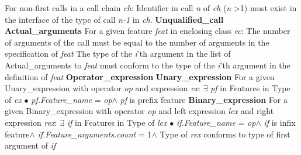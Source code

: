 \indent \indent For non-first calls in a call chain \textit{ch}:\newline
\indent \indent \indent Identifier in call \textit{n} of \textit{ch} (\textit{n} \textgreater 1) must exist in the interface of the type of call \textit{n-1} in \textit{ch}.\newline
\indent \textbf{Unqualified\_call}\newline
\indent \indent \textbf{Actual\_arguments}\newline
\indent \indent \indent For a given feature \textit{feat} in enclosing class \textit{ec}:\newline
\indent \indent \indent \indent The number of arguments of the call must be equal to the number of arguments in the \newline
\indent \indent \indent \indent specification of \textit{feat}\newline
\indent \indent \indent The type of the \textit{i}'th argument in the list of Actual\_arguments to \textit{feat} must conform to the \newline
\indent \indent \indent type of the \textit{i}'th argument in the definition of \textit{feat}\newline
\indent \textbf{Operator\_expression}\newline
\indent \indent \textbf{Unary\_expression}\newline
\indent \indent \indent For a given Unary\_expression with operator \textit{op} and expression \textit{ex}:\newline
\indent \indent \indent \indent $\exists$ \textit{pf} in Features in Type of \textit{ex} $\bullet$ \textit{pf.Feature\_name} = \textit{op}$\wedge$ \textit{pf} is prefix feature\newline
\indent \indent \textbf{Binary\_expression}\newline
\indent \indent \indent For a given Binary\_expression with operator \textit{op} and left expression \textit{lex} and right expression \newline
\indent \indent \indent \textit{rex}:\newline
\indent \indent \indent \indent $\exists$ \textit{if} in Features in Type of \textit{lex} $\bullet$ \textit{if.Feature\_name} = \textit{op}$\wedge$ \textit{if} is infix feature$\wedge$ \textit{if.Feature\_arguments.count} \newline
\indent \indent \indent \indent = 1$\wedge$ Type of \textit{rex} conforms to type of first argument of \textit{if}\newline
